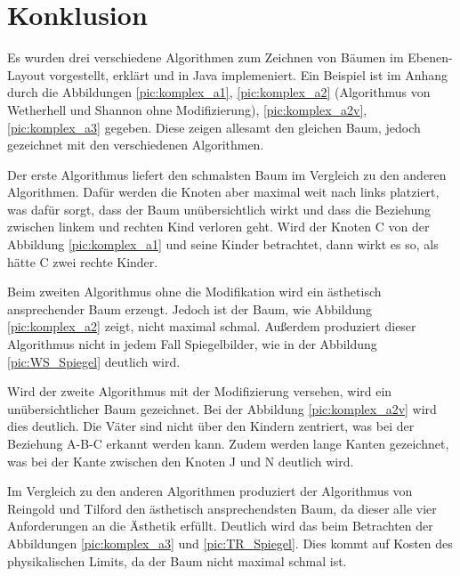 \chapter{Konklusion}
\label{chap:kapitel4}
Es wurden drei verschiedene Algorithmen zum Zeichnen von Bäumen im Ebenen-Layout vorgestellt, erklärt und in Java implemeniert.
Ein Beispiel ist im Anhang durch die Abbildungen \ref{pic:komplex_a1}, \ref{pic:komplex_a2} (Algorithmus von Wetherhell und Shannon 
ohne Modifizierung), \ref{pic:komplex_a2v}, \ref{pic:komplex_a3} gegeben.
Diese zeigen allesamt den gleichen Baum, jedoch gezeichnet mit den verschiedenen Algorithmen. 

Der erste Algorithmus liefert den schmalsten Baum im Vergleich zu den anderen Algorithmen. Dafür werden die Knoten aber maximal weit nach links
platziert, was dafür sorgt, dass der Baum unübersichtlich wirkt und dass die Beziehung zwischen linkem und rechten Kind verloren geht. Wird der
Knoten C von der Abbildung \ref{pic:komplex_a1} und seine Kinder betrachtet, dann wirkt es so, als hätte C zwei rechte Kinder.

Beim zweiten Algorithmus ohne die Modifikation wird ein ästhetisch ansprechender Baum erzeugt. Jedoch ist der Baum, wie Abbildung
\ref{pic:komplex_a2} zeigt, nicht maximal schmal. Außerdem produziert dieser Algorithmus nicht in jedem Fall Spiegelbilder, wie in der
Abbildung \ref{pic:WS_Spiegel} deutlich wird. 

Wird der zweite Algorithmus mit der Modifizierung versehen, wird ein unübersichtlicher Baum gezeichnet. Bei der Abbildung \ref{pic:komplex_a2v}
wird dies deutlich. Die Väter sind nicht über den Kindern zentriert, was bei der Beziehung A-B-C erkannt werden kann. Zudem werden lange Kanten
gezeichnet, was bei der Kante zwischen den Knoten J und N deutlich wird.

Im Vergleich zu den anderen Algorithmen produziert der Algorithmus von Reingold und Tilford den ästhetisch ansprechendsten Baum, da dieser
alle vier Anforderungen an die Ästhetik erfüllt. Deutlich wird das beim Betrachten der Abbildungen \ref{pic:komplex_a3} und \ref{pic:TR_Spiegel}.
Dies kommt auf Kosten des physikalischen Limits, da der Baum nicht maximal schmal ist.

